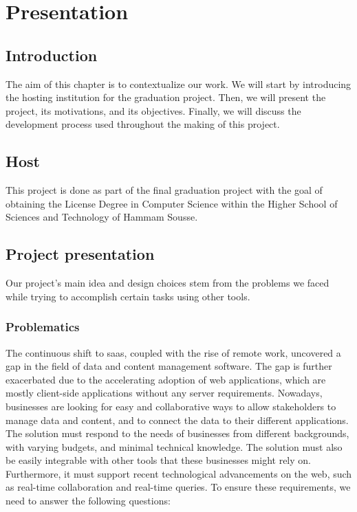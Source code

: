 \chapter{Presentation}
\label{chap:intro}

\section{Introduction}

The aim of this chapter is to contextualize our work.
We will start by introducing the hosting institution for the graduation project.
Then, we will present the project, its motivations, and its objectives.
Finally, we will discuss the development process used throughout the making of this project.

\section{Host}

This project is done as part of the final graduation project with the goal of obtaining the License Degree in Computer Science within the Higher School of Sciences and Technology of Hammam Sousse.

\section{Project presentation}

Our project's main idea and design choices stem from the problems we faced while trying to accomplish certain tasks using other tools.

\subsection{Problematics}

The continuous shift to \acrfull{saas}, coupled with the rise of remote work, uncovered a gap in the field of data and content management software.
The gap is further exacerbated due to the accelerating adoption of web applications, which are mostly client-side applications without any server requirements.
Nowadays, businesses are looking for easy and collaborative ways to allow stakeholders to manage data and content, and to connect the data to their different applications.
The solution must respond to the needs of businesses from different backgrounds, with varying budgets, and minimal technical knowledge.
The solution must also be easily integrable with other tools that these businesses might rely on.
Furthermore, it must support recent technological advancements on the web, such as real-time collaboration and real-time queries.
To ensure these requirements, we need to answer the following questions:

